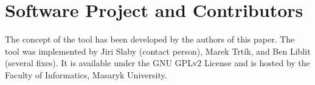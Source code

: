 \documentclass[10pt]{llncs}
\begin{document}

\section{Software Project and Contributors}
The concept of the tool has been developed by the authors of this paper. The
tool was implemented by Jiri Slaby (contact person), Marek Trt\'ik, and Ben
Liblit (several fixes).  It is available under the GNU GPLv2 License and is
hosted by the Faculty of Informatics, Masaryk University.





\end{document}
